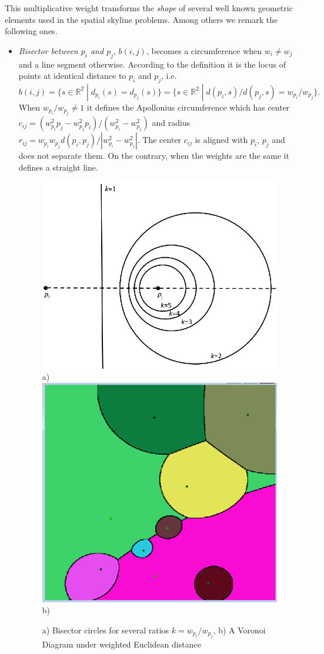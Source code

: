 \documentclass[11pt,onecolumn]{elsart3p}
\begin{document}
        This multiplicative weight transforms the {\it shape} of several well known geometric elements used in the spatial skyline problems. Among others we remark the following ones. \\
        \begin{itemize}
        \item {\it Bisector between $p_i$ and $p_j$}, $b(i,j)$, becomes a circumference when $w_i\neq w_j$ and a line segment otherwise. According to the definition it is the locus of points at identical distance to $p_i$ and $p_j$, i.e. $$ b(i,j) = \{ s \in \mathbb{R}^2 \; | \; d_{p_i}(s)=d_{p_j}(s)\}  = \{ s \in \mathbb{R}^2 \; | \; d(p_i,s)/d(p_j,s)=w_{p_i}/w_{p_j}\}.$$ When $w_{p_i} / w_{p_j} \neq 1$ it defines the Apollonius circumference which has center $c_{ij}=(w_{p_i}^2 p_j - w_{p_j}^2 p_i)/(w_{p_i}^2 - w_{p_j}^2)$ and radius $r_{ij}=w_{p_i}w_{p_j} d(p_i,p_j)/|w_{p_i}^2 - w_{p_j}^2|$. The center $c_{ij}$ is aligned with $p_i$,  $p_j$ and does not separate them. On the contrary, when the weights are the same it defines a straight line.


        \begin{figure}[h]
        \begin{center}
        \includegraphics[width=0.35\linewidth]{img/bisectors_w.eps} a) \qquad
        \includegraphics[width=0.3\linewidth]{img/vd_weighted.eps} b)
        \caption{a) Bisector circles for several ratios $k=w_{p_i}/w_{p_j}$, b) A Voronoi Diagram under weighted Euclidean distance }
        \label{fig:WD_Bis_VD}
        \end{center}
        \end{figure}



\end{itemize}
\end{document}
